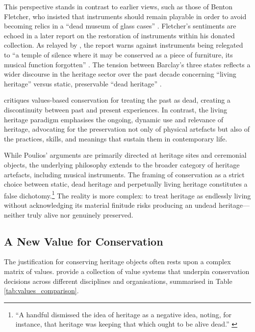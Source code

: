 This perspective stands in contrast to earlier views, such as those of Benton
Fletcher, who insisted that instruments should remain playable in order to avoid
becoming relics in a ``dead museum of glass cases'' \cite[p.\ 154, quoted in a
letter]{barclay_preservation_2005}. Fletcher’s sentiments are echoed in a later
report on the restoration of instruments within his donated collection. As
relayed by \textcite{barclay_critical_1999}, the report warns against
instruments being relegated to ``a temple of silence where it may be conserved
as a piece of furniture, its musical function forgotten''
\cite{adlam_proposal_1972}. The tension between Barclay’s three states reflects
a wider discourse in the heritage sector over the past decade concerning
``living heritage'' versus static, preservable ``dead heritage''
\cite{poulios_moving_2010, smith_uses_2006}.

\textcite{poulios_moving_2010} critiques values-based conservation for treating
the past as dead, creating a discontinuity between past and present experiences.
In contrast, the living heritage paradigm emphasises the ongoing, dynamic use
and relevance of heritage, advocating for the preservation not only of physical
artefacts but also of the practices, skills, and meanings that sustain them in
contemporary life.

While Poulios’ arguments are primarily directed at heritage sites and ceremonial
objects, the underlying philosophy extends to the broader category of heritage
artefacts, including musical instruments. The framing of conservation as a
strict choice between static, dead heritage and perpetually living heritage
constitutes a false dichotomy.\footnote{``A handful dismissed the idea of
heritage as a negative idea, noting, for instance, that heritage was keeping
that which ought to be alive dead.'' \cite{smith_uses_2006}} The reality is more
complex: to treat heritage as endlessly living without acknowledging its
material finitude risks producing an undead heritage---neither truly alive nor
genuinely preserved.


\subsection{A New Value for Conservation}

The justification for conserving heritage objects often rests upon a complex
matrix of values. \textcite{avrami_values_2000} provide a collection of value
systems that underpin conservation decisions across different disciplines and
organisations, summarised in Table \ref{tab:values_comparison}.

